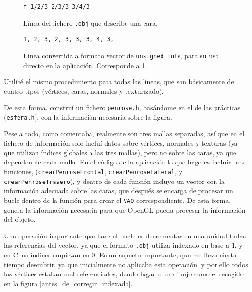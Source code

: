 \documentclass[a4paper,12pt]{article}
\begin{document}
\begin{figure}[h]
    \centering
    \begin{minipage}[c]{0.7\textwidth}
        \begin{lstlisting}
f 1/2/3 2/3/3 3/4/3
        \end{lstlisting}
    \end{minipage}
    \caption{Línea del fichero \texttt{.obj} que describe una cara.} \label{lineas_obj}
\end{figure}
\begin{figure}[h]
    \centering
    \begin{minipage}[c]{0.7\textwidth}
        \begin{lstlisting}
1, 2, 3, 2, 3, 3, 3, 4, 3,
        \end{lstlisting}
    \end{minipage}
    \caption{Línea convertida a formato vector de \texttt{unsigned int}s, para su uso directo en la aplicación. Corresponde a \ref{lineas_obj}.} \label{lineas_obj_convertidas}
\end{figure}

Utilicé el mismo procedimiento para todas las líneas, que son básicamente de cuatro tipos (vértices, caras, normales y texturizado).

De esta forma, construí un fichero \texttt{penrose.h}, basándome en el de las prácticas (\texttt{esfera.h}), con la información necesaria sobre la figura.

Pese a todo, como comentaba, realmente son tres mallas separadas, así que en el fichero de información solo incluí datos sobre vértices, normales y texturas (ya que utilizan índices globales a las tres mallas), pero no sobre las caras, ya que dependen de cada malla. En el código de la aplicación lo que hago es incluir tres funciones, (\texttt{crearPenroseFrontal}, \texttt{crearPenroseLateral}, y \texttt{crearPenroseTrasero}), y dentro de cada función incluyo un vector con la información adecuada sobre las caras, que después se encarga de procesar un bucle dentro de la función para crear el \texttt{VAO} correspondiente. De esta forma, genera la información necesaria para que OpenGL pueda procesar la información del objeto.

Una operación importante que hace el bucle es decrementar en una unidad todas las referencias del vector, ya que el formato \texttt{.obj} utiliza indexado en base a 1, y en C los índices empiezan en 0. Es un aspecto importante, que me llevó cierto tiempo descubrir, ya que inicialmente no aplicaba esta operación, y por ello todos los vértices estaban mal referenciados, dando lugar a un dibujo como el recogido en la figura \ref{antes_de_corregir_indexado}.
\end{document}
